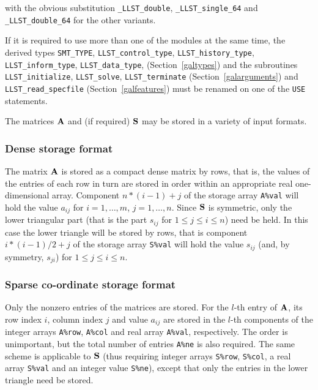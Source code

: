 \documentclass{galahad}
\newcommand{\packagename}{LLST}
\newcommand{\fullpackagename}{\libraryname\_\packagename}
\begin{document}
\medskip
\noindent
with the obvious substitution {\tt \fullpackagename\_double},
{\tt \fullpackagename\_single\_64} and 
{\tt \fullpackagename\_double\_64} for the other variants.

\noindent
If it is required to use more than one of the modules at the same time, 
the derived types
{\tt SMT\_TYPE},
{\tt \packagename\_control\_type},
{\tt \packagename\_history\_\-type},
{\tt \packagename\_inform\_type},
{\tt \packagename\_data\_type},
(Section~\ref{galtypes})
and the subroutines
{\tt \packagename\_initialize},
{\tt \packagename\_solve}, {\tt \packagename\_\-terminate}
(Section~\ref{galarguments})
and
{\tt \packagename\_read\_specfile}
(Section~\ref{galfeatures})
must be renamed on one of the {\tt USE} statements.


\galmatrix
The matrices ${\mathbf{A}}$ and (if required) ${\mathbf{S}}$
may be stored in a variety of input formats.

\subsubsection{Dense storage format}\label{dense}
The matrix ${\mathbf{A}}$ is stored as a compact
dense matrix by rows, that is, the values of the entries of each row in turn are
stored in order within an appropriate real one-dimensional array.
Component $n \ast (i-1) + j$ of the storage array {\tt A\%val} will hold the
value $a_{ij}$ for $i = 1, \ldots , m$, $j = 1, \ldots , n$.
Since ${\mathbf{S}}$ is symmetric, only the lower triangular part (that is the part
$s_{ij}$ for $1 \leq j \leq i \leq n$) need be held. In this case
the lower triangle will be stored by rows, that is
component $i \ast (i-1)/2 + j$ of the storage array {\tt S\%val}
will hold the value $s_{ij}$ (and, by symmetry, $s_{ji}$)
for $1 \leq j \leq i \leq n$.

\subsubsection{Sparse co-ordinate storage format}\label{coordinate}
Only the nonzero entries of the matrices are stored. For the
$l$-th entry of ${\mathbf{A}}$, its row index $i$, column index $j$
and value $a_{ij}$
are stored in the $l$-th components of the integer arrays {\tt A\%row},
{\tt A\%col} and real array {\tt A\%val}, respectively.
The order is unimportant, but the total
number of entries {\tt A\%ne} is also required.
The same scheme is applicable to
${\mathbf{S}}$ (thus requiring integer arrays {\tt S\%row}, {\tt S\%col}, a real array
{\tt S\%val} and an integer value {\tt S\%ne}),
except that only the entries in the lower triangle need be stored.
\end{document}

